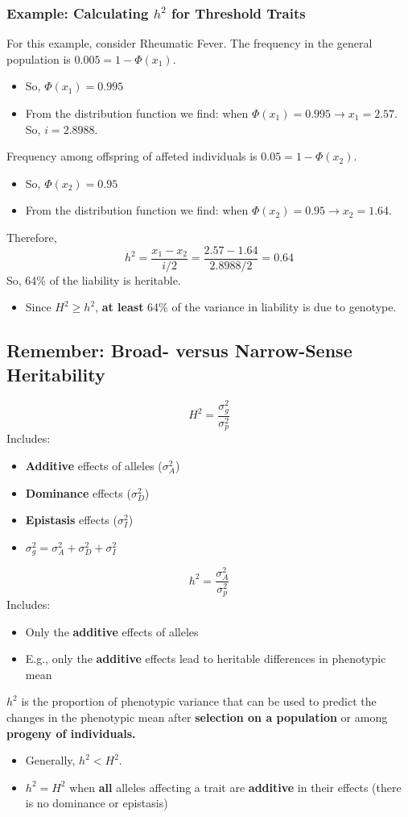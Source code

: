 \documentclass[10pt]{article}
\begin{document}
\subsubsection*{Example: Calculating $h^2$ for Threshold Traits}
For this example, consider Rheumatic Fever.  The frequency in the general population is $0.005 = 1 - \Phi(x_1)$.
\begin{itemize}
	\item So, $\Phi(x_1) = 0.995$
	\item From the distribution function we find: when $\Phi(x_1) = 0.995 \rightarrow x_1 = 2.57$.  So, $i = 2.8988$.
\end{itemize}
Frequency among offspring of affeted individuals is $0.05 = 1 - \Phi(x_2)$.
\begin{itemize}
	\item So, $\Phi(x_2) = 0.95$
	\item From the distribution function we find: when $\Phi(x_2) = 0.95 \rightarrow x_2 = 1.64$.
\end{itemize}
Therefore,
\[h^2 = \frac{x_1 - x_2}{i / 2} = \frac{2.57 - 1.64}{2.8988 / 2} = 0.64\]
So, 64\% of the liability is heritable.
\begin{itemize}
	\item Since $H^2 \geq h^2$, \textbf{at least} 64\% of the variance in liability is due to genotype.
\end{itemize}

\subsection*{Remember: Broad- versus Narrow-Sense Heritability}
\[H^2 = \frac{\sigma_g^2}{\sigma_p^2}\]
Includes:
\begin{itemize}
	\item \textbf{Additive} effects of alleles ($\sigma_A^2$)
	\item \textbf{Dominance} effects ($\sigma_D^2$)
    \item \textbf{Epistasis} effects ($\sigma_I^2$)
    \item $\sigma_g^2 = \sigma_A^2 + \sigma_D^2 + \sigma_I^2$ 
\end{itemize}
\[h^2 = \frac{\sigma_A^2}{\sigma_p^2}\]
Includes: 
\begin{itemize}
	\item Only the \textbf{additive} effects of alleles
	\item E.g., only the \textbf{additive} effects lead to heritable differences in phenotypic mean
\end{itemize}
$h^2$ is the proportion of phenotypic variance that can be used to predict the changes in the phenotypic mean after \textbf{selection on a population} or among \textbf{progeny of individuals.}
\begin{itemize}
	\item Generally, $h^2 < H^2$.
	\item $h^2 = H^2$ when \textbf{all} alleles affecting a trait are \textbf{additive} in their effects (there is no dominance or epistasis)
\end{itemize}
\end{document}
